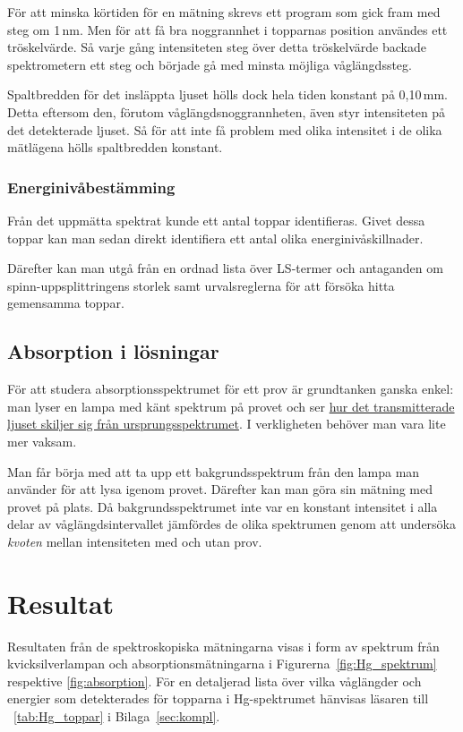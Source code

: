 \documentclass[11pt,a4paper]{article}
\newcommand{\tabref}{\tablename~\ref} %
\begin{document}
För att minska körtiden för en mätning skrevs ett program som gick
fram med steg om 1\,nm. Men för att få bra noggrannhet i topparnas
position användes ett tröskelvärde. Så varje gång intensiteten steg
över detta tröskelvärde backade spektrometern ett steg och började gå
med minsta möjliga våglängdssteg. 

Spaltbredden för det insläppta ljuset hölls dock hela tiden
konstant på 0,10\,mm. Detta eftersom den, förutom
våglängdsnoggrannheten, även styr intensiteten på det detekterade
ljuset. Så för att inte få problem med olika intensitet i de olika
mätlägena hölls spaltbredden konstant. 

\subsubsection{Energinivåbestämming}
Från det uppmätta spektrat kunde ett antal toppar identifieras. Givet
dessa toppar kan man sedan direkt identifiera ett antal olika
energinivåskillnader. 

Därefter kan man utgå från en ordnad lista över LS-termer och
antaganden om spinn-uppsplittringens storlek samt urvalsreglerna för
att försöka hitta gemensamma toppar. 


\subsection{Absorption i lösningar}

För att studera absorptionsspektrumet för ett prov är grundtanken
ganska enkel: man lyser en lampa med känt spektrum på provet och ser
\href{https://xkcd.com/1517/}{hur det transmitterade ljuset skiljer
  sig från ursprungsspektrumet}. I verkligheten behöver man vara lite
mer vaksam. 

Man får börja med att ta upp ett bakgrundsspektrum från den lampa man
använder för att lysa igenom provet. Därefter kan man göra sin mätning
med provet på plats. Då bakgrundsspektrumet inte var en konstant
intensitet i alla delar av våglängdsintervallet jämfördes de olika
spektrumen genom att undersöka \emph{kvoten} mellan intensiteten med
och utan prov. 


\section{Resultat}
Resultaten från de spektroskopiska mätningarna visas i form av
spektrum från kvicksilverlampan och absorptionsmätningarna i
Figurerna~\ref{fig:Hg_spektrum} respektive \ref{fig:absorption}.
För en detaljerad lista över vilka våglängder och energier som
detekterades för topparna i Hg-spektrumet hänvisas läsaren till
\tabref{tab:Hg_toppar} i Bilaga~\ref{sec:kompl}.  
\end{document}
